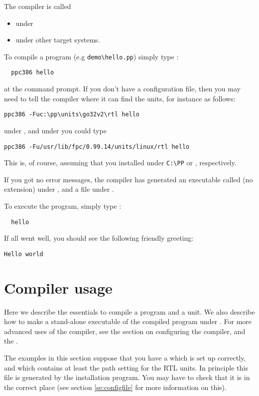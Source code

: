 \documentclass{report}
\begin{document}
The compiler is called
\begin{itemize}
\item {} under \linux
\item {} under other target systems.
\end{itemize}
To compile a program (e.g \verb|demo\hello.pp|) simply type :
\begin{verbatim}
  ppc386 hello
\end{verbatim}
at the command prompt. If you don't have a configuration file, then you may
need to tell the compiler where it can find the units, for instance as
follows:
\begin{verbatim}
ppc386 -Fuc:\pp\units\go32v2\rtl hello
\end{verbatim}
under \dos, and under \linux you could type
\begin{verbatim}
ppc386 -Fu/usr/lib/fpc/0.99.14/units/linux/rtl hello
\end{verbatim}
This is, of course, assuming that you installed under \verb|C:\PP| or
, respectively.

If you got no error messages, the compiler has generated an executable
called  (no extension) under \linux, and a file 
under \dos.

To execute the program, simply type :
\begin{verbatim}
  hello
\end{verbatim}
If all went well, you should see the following friendly greeting:
\begin{verbatim}
Hello world
\end{verbatim}

\chapter{Compiler usage}
\label{ch:Usage}

Here we describe the essentials to compile a program and a unit.
We also describe how to make a stand-alone executable of the
compiled program under \dos. For more advanced uses of the compiler,
see the section on configuring the compiler, and the
\progref{}.

The examples in this section suppose that you have a  which
is set up correctly, and which contains at least the path setting for the
RTL units. In principle this file is generated by the installation program.
You may have to check that it is in the correct place (see section
\ref{se:configfile} for more information on this).
\end{document}
